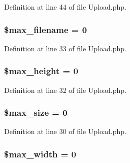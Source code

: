 Definition at line 44 of file Upload.\+php.

\subsubsection[{\texorpdfstring{\$max\+\_\+filename}{$max_filename}}]{\setlength{\rightskip}{0pt plus 5cm}\$max\+\_\+filename = 0}\hypertarget{class_c_i___upload_a7c8c80e453111c2521e355b83331a9df}{}\label{class_c_i___upload_a7c8c80e453111c2521e355b83331a9df}


Definition at line 33 of file Upload.\+php.

\subsubsection[{\texorpdfstring{\$max\+\_\+height}{$max_height}}]{\setlength{\rightskip}{0pt plus 5cm}\$max\+\_\+height = 0}\hypertarget{class_c_i___upload_a7f2b56fde8cdd8907f9228149fc4b9bc}{}\label{class_c_i___upload_a7f2b56fde8cdd8907f9228149fc4b9bc}


Definition at line 32 of file Upload.\+php.

\subsubsection[{\texorpdfstring{\$max\+\_\+size}{$max_size}}]{\setlength{\rightskip}{0pt plus 5cm}\$max\+\_\+size = 0}\hypertarget{class_c_i___upload_a3fec414be9f76cb7ba77ed79b784de62}{}\label{class_c_i___upload_a3fec414be9f76cb7ba77ed79b784de62}


Definition at line 30 of file Upload.\+php.

\subsubsection[{\texorpdfstring{\$max\+\_\+width}{$max_width}}]{\setlength{\rightskip}{0pt plus 5cm}\$max\+\_\+width = 0}\hypertarget{class_c_i___upload_a7f6a5db40a5fd00c8babbd37480b00fc}{}\label{class_c_i___upload_a7f6a5db40a5fd00c8babbd37480b00fc}


